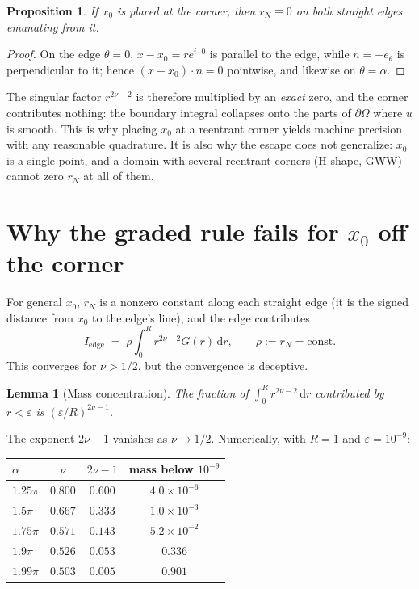 \documentclass[11pt]{article}
\newtheorem{proposition}{Proposition}
\newtheorem{lemma}{Lemma}
\theoremstyle{remark}
\newcommand{\dd}{\,\mathrm{d}}
\newcommand{\Om}{\Omega}
\begin{document}
\begin{proposition}\label{prop:rn}
If $x_0$ is placed at the corner, then $r_N\equiv0$ on both straight edges
emanating from it.
\end{proposition}
\begin{proof}
On the edge $\theta=0$, $x-x_0=r e^{i\cdot 0}$ is parallel to the edge, while
$n=-e_\theta$ is perpendicular to it; hence $(x-x_0)\cdot n=0$ pointwise, and
likewise on $\theta=\alpha$.
\end{proof}

\noindent
The singular factor $r^{2\nu-2}$ is therefore multiplied by an \emph{exact}
zero, and the corner contributes nothing: the boundary integral collapses onto
the parts of $\partial\Om$ where $u$ is smooth. This is why placing $x_0$ at a
reentrant corner yields machine precision with any reasonable quadrature. It is
also why the escape does not generalize: $x_0$ is a single point, and a domain
with several reentrant corners (H-shape, GWW) cannot zero $r_N$ at all of them.

\section{Why the graded rule fails for $x_0$ off the corner}

For general $x_0$, $r_N$ is a nonzero constant along each straight edge (it is
the signed distance from $x_0$ to the edge's line), and the edge contributes
\begin{equation}\label{eq:edge}
  I_{\text{edge}} \;=\; \rho\int_0^R r^{2\nu-2}G(r)\dd r,
  \qquad \rho := r_N = \text{const}.
\end{equation}
This converges for $\nu>1/2$, but the convergence is deceptive.

\begin{lemma}[Mass concentration]\label{lem:mass}
The fraction of $\int_0^R r^{2\nu-2}\dd r$ contributed by $r<\varepsilon$ is
$(\varepsilon/R)^{2\nu-1}$.
\end{lemma}

\noindent
The exponent $2\nu-1$ vanishes as $\nu\to1/2$. Numerically, with $R=1$ and
$\varepsilon=10^{-9}$:
\medskip

\begin{center}
\begin{tabular}{lccc}
\toprule
$\alpha$ & $\nu$ & $2\nu-1$ & mass below $10^{-9}$\\
\midrule
$1.25\pi$ & $0.800$ & $0.600$ & $4.0\times10^{-6}$\\
$1.5\pi$  & $0.667$ & $0.333$ & $1.0\times10^{-3}$\\
$1.75\pi$ & $0.571$ & $0.143$ & $5.2\times10^{-2}$\\
$1.9\pi$  & $0.526$ & $0.053$ & $0.336$\\
$1.99\pi$ & $0.503$ & $0.005$ & $0.901$\\
\bottomrule
\end{tabular}
\end{center}
\medskip
\end{document}
